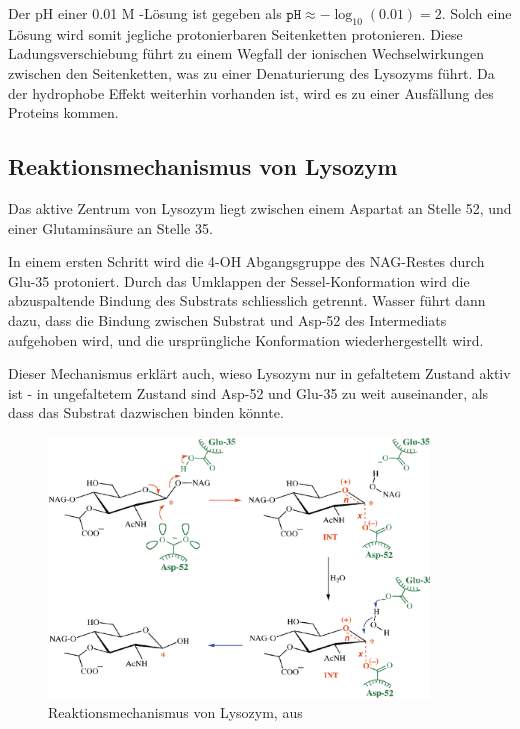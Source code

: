 \documentclass[a4paper,german]{scrreprt}
\begin{document}
Der pH einer 0.01 M -Lösung ist gegeben als $\texttt{pH} \approx
-\log_{10}(0.01) = 2$. Solch eine Lösung wird somit jegliche protonierbaren
Seitenketten protonieren. Diese Ladungsverschiebung führt zu einem Wegfall der
ionischen Wechselwirkungen zwischen den Seitenketten, was zu einer
Denaturierung des Lysozyms führt. Da der hydrophobe Effekt weiterhin vorhanden
ist, wird es zu einer Ausfällung des Proteins kommen.

\subsection{Reaktionsmechanismus von Lysozym}

Das aktive Zentrum von Lysozym liegt zwischen einem Aspartat an Stelle 52, und
einer Glutaminsäure an Stelle 35.

In einem ersten Schritt wird die 4-OH Abgangsgruppe des NAG-Restes durch Glu-35
protoniert. Durch das Umklappen der Sessel-Konformation wird die abzuspaltende
Bindung des Substrats schliesslich getrennt. Wasser führt dann dazu, dass die
Bindung zwischen Substrat und Asp-52 des Intermediats aufgehoben wird, und die
ursprüngliche Konformation wiederhergestellt wird. \cite{lys}

Dieser Mechanismus erklärt auch, wieso Lysozym nur in gefaltetem Zustand aktiv
ist - in ungefaltetem Zustand sind Asp-52 und Glu-35 zu weit auseinander, als
dass das Substrat dazwischen binden könnte.

\begin{figure}[h]
	\centering
	\includegraphics[width=0.9\textwidth]{data/lys_mechanism}
	\caption{Reaktionsmechanismus von Lysozym, aus \cite{lys}}
	\label{fig:lys_mechanism}
\end{figure}
\end{document}
